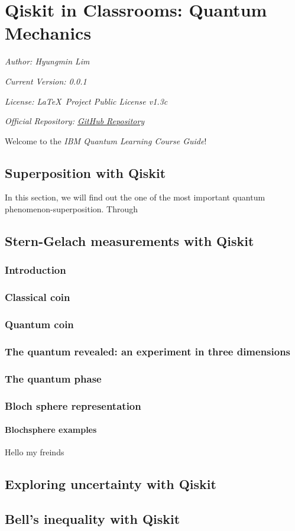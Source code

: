 \chapter[Qiskit in Classrooms: Quantum Mechanics]{Qiskit in Classrooms: Quantum Mechanics}
\label{cp:introduction}

\parindent0pt

\textit{Author: Hyungmin Lim}

\textit{Current Version: 0.0.1}

\textit{License: \LaTeX~Project Public License v1.3c}

\textit{Official Repository: \href{https://github.com/joseareia/ipleiria-thesis}{GitHub Repository}}

\vspace{.935em}

Welcome to the \textcolor{maincolor}{\textit{IBM Quantum Learning Course Guide}}! 

\section{Superposition with Qiskit}

In this section, we will find out the one of the most important quantum phenomenon-superposition. Through 


\section{Stern-Gelach measurements with Qiskit}

\subsection{Introduction}
\subsection{Classical coin}
\subsection{Quantum coin}
\subsection{The quantum revealed: an experiment in three dimensions}
\subsection{The quantum phase}
\subsection{Bloch sphere representation}
\subsubsection{Blochsphere examples}
Hello my freinds


\section{Exploring uncertainty with Qiskit}


\section{Bell's inequality with Qiskit}